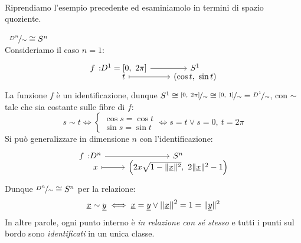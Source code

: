 	\begin{minipage}[t]{0.16\textwidth}\vspace{1mm}
	\end{minipage}\vspace{3mm}\\
Riprendiamo l'esempio precedente ed esaminiamolo in termini di spazio quoziente.
\begin{example}~{$\nicefrac{D^n}{\sim}\cong S^n$}\\
	Consideriamo il caso $n=1$:
	\begin{equation*}
		\funztot f {D^1=[0, \ 2\pi]} {S^1} t {(\cos t, \ \sin t)}
	\end{equation*}
	La funzione $f$ è un identificazione, dunque $S^1\cong \nicefrac{[0, \ 2\pi]}{\sim}\cong \nicefrac{[0, \ 1]}{\sim}=\nicefrac{D^1}{\sim}$, con $\sim$ tale che sia costante sulle fibre di $f$: 
	\begin{equation*}
		 s\sim t \iff \begin{cases} 
			\cos s=\cos t \\
			\sin s =\sin t
		\end{cases} \iff s=t  \vee s=0,\ t=2\pi
	\end{equation*} \newline
	Si può generalizzare in dimensione $n$ con l'identificazione:
	\begin{equation*}
		\funztot f {D^n} {S^n} x {\left( 2x\sqrt{1- \| \underline{x} \|^2}, \ 2\| \underline{x}\|^2 -1 \right)}
	\end{equation*}
	Dunque $\nicefrac{D^n}{\sim}\cong S^n$ per la relazione:
\begin{equation*}
	\underline{x}\sim \underline{y} \iff \underline{x}=\underline{y} \vee \left|\left| \underline{x} \right|\right| ^2 = 1 = \| \underline{y} \| ^2
\end{equation*}
	In altre parole, ogni punto interno è \textit{in relazione con sé stesso} e tutti i punti sul bordo sono \textit{identificati} in un unica classe.
\end{example}
	
